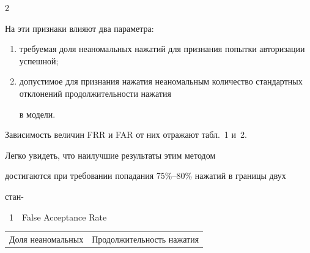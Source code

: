 \begin{multicols}{2}
\begin{itemize}
\end{itemize}







На эти признаки влияют два параметра:

\begin{enumerate}[(1)]

\item требуемая доля неаномальных нажатий для признания попытки авторизации успешной;

\item %

допустимое для признания нажатия неаномальным количество стандартных отклонений продолжительности нажатия 

в модели.

\end{enumerate}

 Зависимость величин FRR и FAR от них отражают табл.~1 и~2.

Легко увидеть, что наилучшие результаты этим методом

достигаются при требовании попадания 75\%--80\% нажатий в границы двух

стан-\linebreak\vspace*{-12pt}

\begin{center}  %


{{\tablename~1}\ \ \small{False Acceptance Rate}}



\vspace*{6pt}









{\small


\tabcolsep=4.1pt

\begin{tabular}{|c|c|c|c|c|}

\hline

        Доля неаномальных   &\multicolumn{4}{c|}{ Продолжительность нажатия}\\


\end{tabular}}
\end{center}
\end{multicols}
